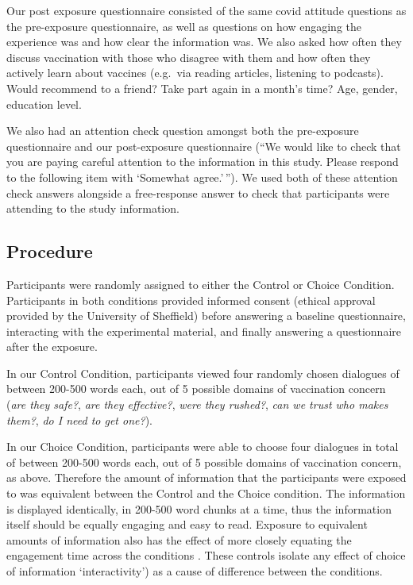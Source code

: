 \documentclass[
  english,
  ,jou,floatsintext]{apa6}
\begin{document}
Our post exposure questionnaire consisted of the same covid attitude questions as the pre-exposure questionnaire, as well as questions on how engaging the experience was and how clear the information was. We also asked how often they discuss vaccination with those who disagree with them and how often they actively learn about vaccines (e.g.~via reading articles, listening to podcasts). Would recommend to a friend? Take part again in a month's time? Age, gender, education level.

We also had an attention check question amongst both the pre-exposure questionnaire and our post-exposure questionnaire (``We would like to check that you are paying careful attention to the information in this study. Please respond to the following item with `Somewhat agree.'\,''). We used both of these attention check answers alongside a free-response answer to check that participants were attending to the study information.

\hypertarget{procedure}{%
\subsection{Procedure}\label{procedure}}

Participants were randomly assigned to either the Control or Choice Condition. Participants in both conditions provided informed consent (ethical approval provided by the University of Sheffield) before answering a baseline questionnaire, interacting with the experimental material, and finally answering a questionnaire after the exposure.

In our Control Condition, participants viewed four randomly chosen dialogues of between 200-500 words each, out of 5 possible domains of vaccination concern (\emph{are they safe?}, \emph{are they effective?}, \emph{were they rushed?}, \emph{can we trust who makes them?}, \emph{do I need to get one?}).

In our Choice Condition, participants were able to choose four dialogues in total of between 200-500 words each, out of 5 possible domains of vaccination concern, as above. Therefore the amount of information that the participants were exposed to was equivalent between the Control and the Choice condition. The information is displayed identically, in 200-500 word chunks at a time, thus the information itself should be equally engaging and easy to read. Exposure to equivalent amounts of information also has the effect of more closely equating the engagement time across the conditions . These controls isolate any effect of choice of information `interactivity') as a cause of difference between the conditions.
\end{document}
